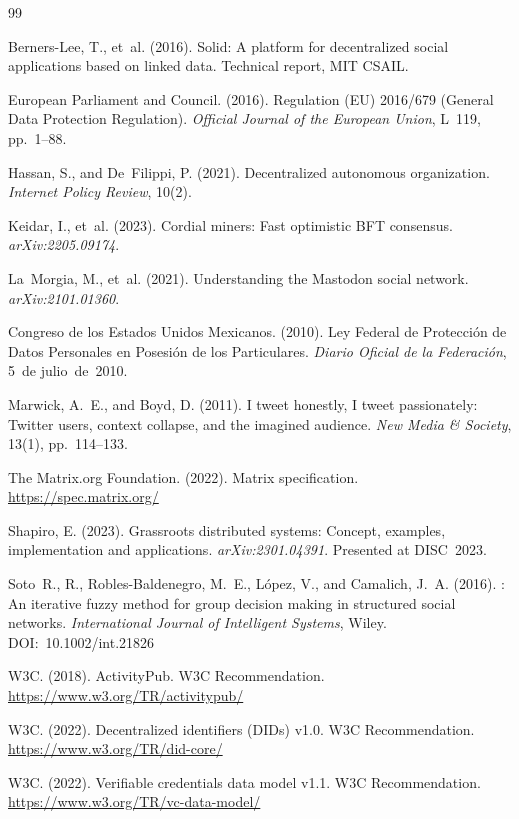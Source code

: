 \documentclass[12pt]{article}
\begin{document}
	
	
	\begin{thebibliography}{99}
		
		Berners-Lee, T., et~al. (2016).
		\newblock Solid: A platform for decentralized social applications based on linked data.
		\newblock Technical report, MIT CSAIL.
		
		European Parliament and Council. (2016).
		\newblock Regulation (EU) 2016/679 (General Data Protection Regulation).
		\newblock \textit{Official Journal of the European Union}, L~119, pp.~1--88.
		
		Hassan, S., and De~Filippi, P. (2021).
		\newblock Decentralized autonomous organization.
		\newblock \textit{Internet Policy Review}, 10(2).
		
		Keidar, I., et~al. (2023).
		\newblock Cordial miners: Fast optimistic BFT consensus.
		\newblock \textit{arXiv:2205.09174}.
		
		La~Morgia, M., et~al. (2021).
		\newblock Understanding the Mastodon social network.
		\newblock \textit{arXiv:2101.01360}.
		
		Congreso de los Estados Unidos Mexicanos. (2010).
		\newblock Ley Federal de Protecci\'on de Datos Personales en Posesi\'on
		de los Particulares.
		\newblock \textit{Diario Oficial de la Federaci\'on}, 5~de julio~de~2010.
		
		Marwick, A.~E., and Boyd, D. (2011).
		\newblock I tweet honestly, I tweet passionately: Twitter users, context
		collapse, and the imagined audience.
		\newblock \textit{New Media \& Society}, 13(1), pp.~114--133.
		
		The Matrix.org Foundation. (2022).
		\newblock Matrix specification.
		\newblock \url{https://spec.matrix.org/}
		
		Shapiro, E. (2023).
		\newblock Grassroots distributed systems: Concept, examples, implementation
		and applications.
		\newblock \textit{arXiv:2301.04391}. Presented at DISC~2023.
		
		Soto~R., R., Robles-Baldenegro, M.~E., L\'opez, V., and Camalich, J.~A. (2016).
		: An iterative fuzzy method for group decision making in
		structured social networks.
		\newblock \textit{International Journal of Intelligent Systems}, Wiley.
		\newblock DOI:~10.1002/int.21826
		
		W3C. (2018).
		\newblock ActivityPub.
		\newblock W3C Recommendation.
		\newblock \url{https://www.w3.org/TR/activitypub/}
		
		W3C. (2022).
		\newblock Decentralized identifiers ({DIDs}) v1.0.
		\newblock W3C Recommendation.
		\newblock \url{https://www.w3.org/TR/did-core/}
		
		W3C. (2022).
		\newblock Verifiable credentials data model v1.1.
		\newblock W3C Recommendation.
		\newblock \url{https://www.w3.org/TR/vc-data-model/}
		
	\end{thebibliography}
	
\end{document}
